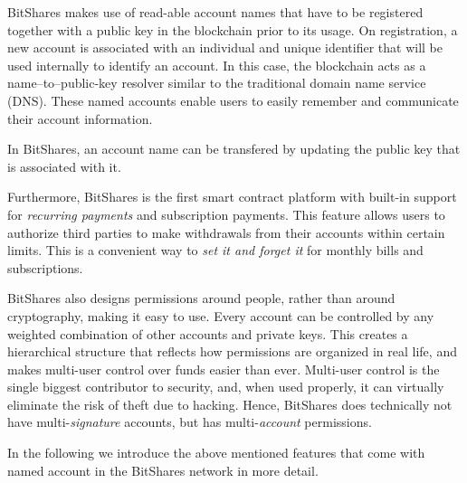 BitShares makes use of read-able account names that have to be registered
together with a public key in the blockchain prior to its usage. On
registration, a new account is associated with an individual and unique
identifier that will be used internally to identify an account. In this case,
the blockchain acts as a name--to--public-key resolver similar to the
traditional domain name service (DNS). These named accounts enable users to
easily remember and communicate their account information.

In BitShares, an account name can be transfered by updating the public key that
is associated with it.

Furthermore, BitShares is the first smart contract platform with built-in
support for \emph{recurring payments} and subscription payments. This feature
allows users to authorize third parties to make withdrawals from their accounts
within certain limits. This is a convenient way to \emph{set it and forget it}
for monthly bills and subscriptions.

BitShares also designs permissions around people, rather than around
cryptography, making it easy to use. Every account can be controlled by any
weighted combination of other accounts and private keys. This creates a
hierarchical structure that reflects how permissions are organized in real
life, and makes multi-user control over funds easier than ever. Multi-user
control is the single biggest contributor to security, and, when used properly,
it can virtually eliminate the risk of theft due to hacking. Hence, BitShares
does technically not have multi-\emph{signature} accounts, but has
multi-\emph{account} permissions.

\medskip

In the following we introduce the above mentioned features that come with named
account in the BitShares network in more detail.
